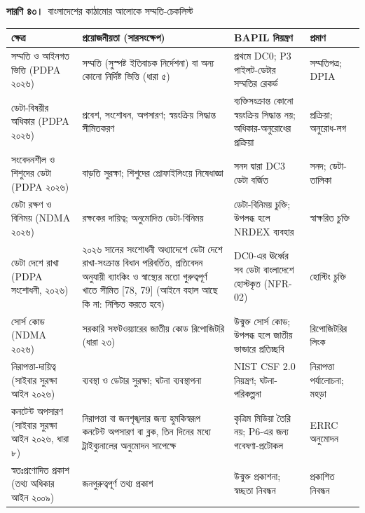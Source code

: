 \documentclass[border=10pt]{standalone}
\begin{document}
\begin{minipage}{17cm}
{\large\bfseries সারণি ৪৩।}\ {\large বাংলাদেশের কাঠামোর আলোকে সম্মতি-চেকলিস্ট}\par\vspace{7pt}
\small
{}
\begin{tabularx}{\linewidth}{@{}>{\hsize=0.800\hsize\raggedright\arraybackslash}X>{\hsize=1.224\hsize\raggedright\arraybackslash}X>{\hsize=1.129\hsize\raggedright\arraybackslash}X>{\hsize=0.847\hsize\raggedright\arraybackslash}X@{}}
\arrayrulecolor{bapilrule}\toprule
\rowcolor{white}\textbf{ক্ষেত্র} & \textbf{প্রয়োজনীয়তা (সারসংক্ষেপ)} & \textbf{BAPIL নিয়ন্ত্রণ} & \textbf{প্রমাণ} \\
\midrule
সম্মতি ও আইনগত ভিত্তি (PDPA ২০২৬) & সম্মতি (সুস্পষ্ট ইতিবাচক নির্দেশনা) বা অন্য কোনো নির্দিষ্ট ভিত্তি (ধারা ৫) & প্রথমে DC0; P3 পাইলট-ডেটার সম্মতির রেকর্ড & সম্মতিপত্র; DPIA \\
ডেটা-বিষয়ীর অধিকার (PDPA ২০২৬) & প্রবেশ, সংশোধন, অপসারণ; স্বয়ংক্রিয় সিদ্ধান্ত সীমিতকরণ & ব্যক্তিসংক্রান্ত কোনো স্বয়ংক্রিয় সিদ্ধান্ত নয়; অধিকার-অনুরোধের প্রক্রিয়া & প্রক্রিয়া; অনুরোধ-লগ \\
সংবেদনশীল ও শিশুদের ডেটা (PDPA ২০২৬) & বাড়তি সুরক্ষা; শিশুদের প্রোফাইলিংয়ে নিষেধাজ্ঞা & সনদ দ্বারা DC3 ডেটা বর্জিত & সনদ; ডেটা-তালিকা \\
ডেটা রক্ষণ ও বিনিময় (NDMA ২০২৬) & রক্ষকের দায়িত্ব; অনুমোদিত ডেটা-বিনিময় & ডেটা-বিনিময় চুক্তি; উপলব্ধ হলে NRDEX ব্যবহার & স্বাক্ষরিত চুক্তি \\
ডেটা দেশে রাখা (PDPA সংশোধনী, ২০২৬) & ২০২৬ সালের সংশোধনী অধ্যাদেশে ডেটা দেশে রাখা-সংক্রান্ত বিধান পরিবর্তিত, প্রতিবেদন অনুযায়ী ব্যাংকিং ও স্বাস্থ্যের মতো গুরুত্বপূর্ণ খাতে সীমিত [78, 79] (আইনে বহাল আছে কি না: নিশ্চিত করতে হবে) & DC0-এর ঊর্ধ্বের সব ডেটা বাংলাদেশে হোস্টকৃত (NFR-02) & হোস্টিং চুক্তি \\
সোর্স কোড (NDMA ২০২৬) & সরকারি সফটওয়্যারের জাতীয় কোড রিপোজিটরি (ধারা ২৩) & উন্মুক্ত সোর্স কোড; উপলব্ধ হলে জাতীয় ভান্ডারে প্রতিচ্ছবি & রিপোজিটরির লিংক \\
নিরাপত্তা-দায়িত্ব (সাইবার সুরক্ষা আইন ২০২৬) & ব্যবস্থা ও ডেটার সুরক্ষা; ঘটনা ব্যবস্থাপনা & NIST CSF 2.0 নিয়ন্ত্রণ; ঘটনা-পরিকল্পনা & নিরাপত্তা পর্যালোচনা; মহড়া \\
কনটেন্ট অপসারণ (সাইবার সুরক্ষা আইন ২০২৬, ধারা ৮) & নিরাপত্তা বা জনশৃঙ্খলার জন্য হুমকিস্বরূপ কনটেন্ট অপসারণ বা ব্লক, তিন দিনের মধ্যে ট্রাইব্যুনালের অনুমোদন সাপেক্ষে & কৃত্রিম মিডিয়া তৈরি নয়; P6-এর জন্য গবেষণা-প্রটোকল & ERRC অনুমোদন \\
স্বতঃপ্রণোদিত প্রকাশ (তথ্য অধিকার আইন ২০০৯) & জনগুরুত্বপূর্ণ তথ্য প্রকাশ & উন্মুক্ত প্রকাশনা; স্বচ্ছতা নিবন্ধন & প্রকাশিত নিবন্ধন \\

\end{tabularx}
\end{minipage}
\end{document}
